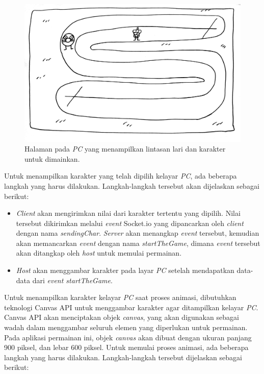 \begin{enumerate}
\begin{figure}[H]
	\centering
	\includegraphics[scale=0.1]{Gambar/web5_gameplay2}
	\caption{Halaman pada \textit{PC} yang menampilkan lintasan lari dan karakter untuk dimainkan.}
	\label{fig:web5_gameplay2}
\end{figure}
	Untuk menampilkan karakter yang telah dipilih kelayar \textit{PC}, ada beberapa langkah yang harus dilakukan. Langkah-langkah tersebut akan dijelaskan sebagai berikut:
	\begin{itemize}
		\item \textit{Client} akan mengirimkan nilai dari karakter tertentu yang dipilih. Nilai tersebut dikirimkan melalui \textit{event} Socket.io yang dipancarkan oleh \textit{client} dengan nama \textit{sendingChar}. \textit{Server} akan menangkap \textit{event} tersebut, kemudian akan memancarkan \textit{event} dengan nama \textit{startTheGame}, dimana \textit{event} tersebut akan ditangkap oleh \textit{host} untuk memulai permainan.
		
		\item \textit{Host} akan menggambar karakter pada layar \textit{PC} setelah mendapatkan data-data dari \textit{event startTheGame}.
		
		
	\end{itemize}
	
	Untuk menampilkan karakter kelayar \textit{PC} saat proses animasi, dibutuhkan teknologi Canvas API untuk menggambar karakter agar ditampilkan kelayar \textit{PC}. Canvas API akan menciptakan objek \textit{canvas}, yang akan digunakan sebagai wadah dalam menggambar seluruh elemen yang diperlukan untuk permainan. Pada aplikasi permainan ini, objek \textit{canvas} akan dibuat dengan ukuran panjang 900 piksel, dan lebar 600 piksel. Untuk memulai proses animasi, ada beberapa langkah yang harus dilakukan. Langkah-langkah tersebut dijelaskan sebagai berikut:
	

\end{enumerate}
